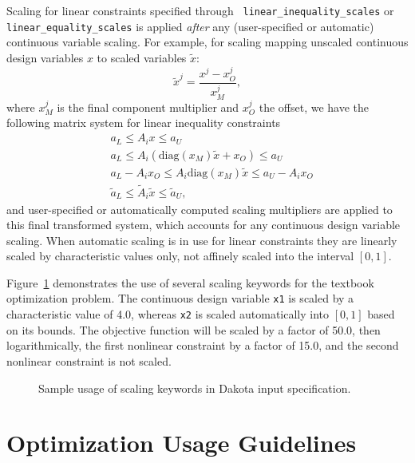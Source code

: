 Scaling for linear constraints specified through {\tt
linear\_inequality\_scales} or {\tt linear\_equality\_scales} is
applied {\em after} any (user-specified or automatic) continuous
variable scaling. For example, for scaling mapping unscaled
continuous design variables $x$ to scaled variables $\tilde{x}$:
\[ \tilde{x}^j = \frac{x^j - x^j_O}{x^j_M}, \]
where $x^j_M$ is the final component multiplier and $x^j_O$ the
offset, we have the following matrix system for linear inequality
constraints
\begin{eqnarray*}
& a_L \leq A_i x \leq a_U \\
& a_L \leq A_i \left( \mathrm{diag}(x_M) \tilde{x} + x_O \right) \leq a_U \\
& a_L - A_i x_O \leq A_i \mathrm{diag}(x_M) \tilde{x} \leq a_U - A_i x_O \\
& \tilde{a}_L \leq \tilde{A}_i \tilde{x} \leq \tilde{a}_U,
\end{eqnarray*}
and user-specified or automatically computed scaling multipliers are
applied to this final transformed system, which accounts for any
continuous design variable scaling. When automatic scaling is in use
for linear constraints they are linearly scaled by characteristic
values only, not affinely scaled into the interval $[0,1]$.

Figure~\ref{opt:additional:scaling:figure01} demonstrates the use of
several scaling keywords for the textbook optimization problem.
The continuous design variable {\tt x1} is scaled by a characteristic
value of 4.0, whereas {\tt x2} is scaled automatically into $[0,1]$
based on its bounds. The objective function will be scaled by a
factor of 50.0, then logarithmically, the first nonlinear constraint
by a factor of 15.0, and the second nonlinear constraint is not
scaled.

\begin{figure}
\centering
\begin{bigbox}
\begin{small}
\end{small}
\end{bigbox}
\caption{Sample usage of scaling keywords in Dakota input specification.}
\label{opt:additional:scaling:figure01}
\end{figure}


\section{Optimization Usage Guidelines}\label{opt:usage}


